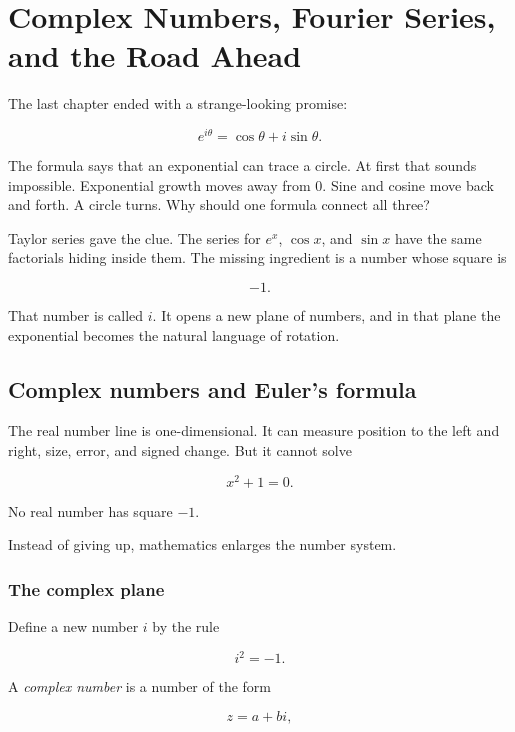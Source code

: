 
\chapter{Complex Numbers, Fourier Series, and the Road Ahead}
\label{chap:complex-fourier-road-ahead}

The last chapter ended with a strange-looking promise:

\[
e^{i\theta}=\cos\theta+i\sin\theta.
\]

The formula says that an exponential can trace a circle.  At first that sounds impossible.
Exponential growth moves away from \(0\).  Sine and cosine move back and forth.  A
circle turns.  Why should one formula connect all three?

Taylor series gave the clue.  The series for \(e^x\), \(\cos x\), and \(\sin x\) have the
same factorials hiding inside them.  The missing ingredient is a number whose square is

\[
-1.
\]

That number is called \(i\).  It opens a new plane of numbers, and in that plane the
exponential becomes the natural language of rotation.

\section{Complex numbers and Euler's formula}
\label{sec:complex-numbers-euler-formula}

The real number line is one-dimensional.  It can measure position to the left and right,
size, error, and signed change.  But it cannot solve

\[
x^2+1=0.
\]

No real number has square \(-1\).

Instead of giving up, mathematics enlarges the number system.

\subsection{The complex plane}
\label{subsec:complex-plane}

Define a new number \(i\) by the rule

\[
\boxed{i^2=-1.}
\]

A \emph{complex number} is a number of the form

\[
\boxed{z=a+bi,}
\]

